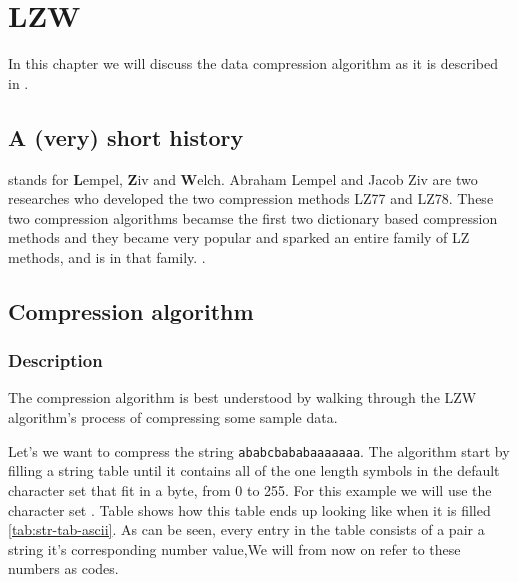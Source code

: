 \begin{comment}
  
\end{comment}

\chapter{LZW}
\label{ch:rle}

\begin{refsection}

In this chapter we will discuss the data compression algorithm \lzw{} as
it is described in
\cite{nelson89:_lzw_data_compr,Welch:1984:THD:1319729.1320134,Salomon:2004:DCC}.

\section{A (very) short history}

\lzw stands for \textbf{L}empel, \textbf{Z}iv and
\textbf{W}elch. Abraham Lempel and Jacob Ziv are two researches who
developed the two compression methods \textsc{LZ77} and
\textsc{LZ78}. These two compression algorithms becamse the first two
dictionary based compression methods and they became very popular and
sparked an entire family of \textsc{LZ} methods, and \lzw is in that family.
\cite{Salomon:2004:DCC}.

\section{Compression algorithm}

\subsection{Description}
\label{sec:lzw-desc}

The \lzw compression algorithm is best
understood by walking through the LZW algorithm's process of
compressing some sample data.

Let's we want to compress the string \texttt{ababcbababaaaaaaa}. The
algorithm start by filling a string table until it
contains all of the one length symbols in the default character set
that fit in a byte, from 0 to 255. For this example we will use the
character set \ascii. Table shows how this table ends up looking like
when it is filled \ref{tab:str-tab-ascii}. As can be seen, every entry
in the table consists of a pair a string it's corresponding number
value,We will from now on refer to these numbers as codes.


\end{refsection}
